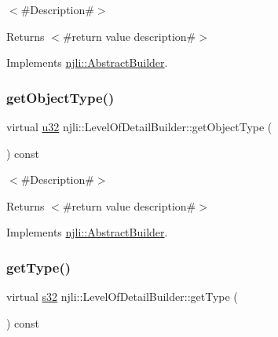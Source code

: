 $<$\#\+Description\#$>$

\begin{DoxyReturn}{Returns}
$<$\#return value description\#$>$ 
\end{DoxyReturn}


Implements \mbox{\hyperlink{classnjli_1_1_abstract_builder_a902f73ea78031b06aca183a417f3413b}{njli\+::\+Abstract\+Builder}}.

\mbox{\label{classnjli_1_1_level_of_detail_builder_ad78a7c87770ebb9d6f2a4e8fd90a80a6}} 
\subsubsection{\texorpdfstring{get\+Object\+Type()}{getObjectType()}}
{\footnotesize\ttfamily virtual \mbox{\hyperlink{_util_8h_a10e94b422ef0c20dcdec20d31a1f5049}{u32}} njli\+::\+Level\+Of\+Detail\+Builder\+::get\+Object\+Type (\begin{DoxyParamCaption}{ }\end{DoxyParamCaption}) const\hspace{0.3cm}{\ttfamily [virtual]}}

$<$\#\+Description\#$>$

\begin{DoxyReturn}{Returns}
$<$\#return value description\#$>$ 
\end{DoxyReturn}


Implements \mbox{\hyperlink{classnjli_1_1_abstract_builder_a0f2d344fcf697b167f4f2b1122b5fb33}{njli\+::\+Abstract\+Builder}}.

\mbox{\label{classnjli_1_1_level_of_detail_builder_a99bde1451b3b110d62ecfc881c0f5af2}} 
\subsubsection{\texorpdfstring{get\+Type()}{getType()}}
{\footnotesize\ttfamily virtual \mbox{\hyperlink{_util_8h_aa62c75d314a0d1f37f79c4b73b2292e2}{s32}} njli\+::\+Level\+Of\+Detail\+Builder\+::get\+Type (\begin{DoxyParamCaption}{ }\end{DoxyParamCaption}) const\hspace{0.3cm}{\ttfamily [virtual]}}

